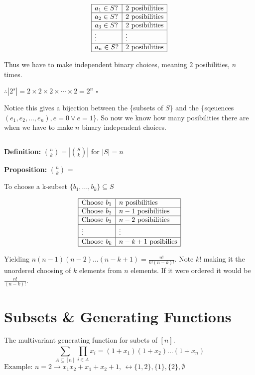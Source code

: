 \documentclass[12pt]{article}
\begin{document}
\[
\begin{array}{|l|l|}
\hline
a_1 \in S? & 2 \text{ posibilities}\\
\hline
a_2 \in S? & 2 \text{ posibilities}\\
\hline
a_3 \in S? & 2 \text{ posibilities}\\
\hline
\vdots & \vdots \\
\hline
a_n \in S? & 2 \text{ posibilities}\\
\hline
\end{array}
\]

\noindent 
Thus we have to make independent binary choices, meaning \(2\) posibilities, \(n\) times.  

\noindent
\(\therefore |2^s| = 2 \times 2 \times 2 \times \cdots \times 2 = 2^n \)
\(\square\)

\noindent Notice this gives a bijection between the \{subsets of \(S\)\} and 
the \{sqeuences \((e_1, e_2,...,e_n), e = 0 \lor e = 1\)\}. 
So now we know how many posibilities there are when we have to make \(n\) 
binary independent choices.

\subsection*{}
\textbf{Definition: } \(\binom{n}{k} = 
|\binom{S}{k}| \text{ for } |S| = n\)

\noindent 
\textbf{Proposition: } \(\binom{n}{k}\) =  

\noindent To choose a k-subset \(\{b_1,...,b_k\} \subseteq S\)

\[
\begin{array}{|l|l|}
\hline
\text{Choose } b_1 & n \text{ posibilities}\\
\hline
\text{Choose } b_2 & n-1 \text{ posibilities}\\
\hline
\text{Choose } b_3 & n-2 \text{ posibilities}\\
\hline
\vdots & \vdots \\
\hline
\text{Choose } b_k & n-k+1 \text{ posibilies}\\
\hline
\end{array}
\]

\noindent Yielding \(n(n-1)(n-2)...(n-k+1) = \frac{n!}{k!(n-k)!}\). 
Note \(k!\) making it the unordered choosing of \(k\) elements from \(n\) elements.
If it were ordered it would be \(\frac{n!}{(n-k)!}\).

\section{Subsets \& Generating Functions}
The multivariant generating function for subets of \([n]\).
\[
  \displaystyle\sum_{A\subseteq[n]}^{}\prod_{i\in A} x_i
  = (1+x_1)(1+x_2)...(1+x_n)
\] 
\( 
  \text{Example: } n = 2 \rightarrow x_1 x_2 + x_1 + x_2 + 1 
  \text{, } \leftrightarrow \{1,2\}, \{1\}, \{2\}, \emptyset
\)
\end{document}
